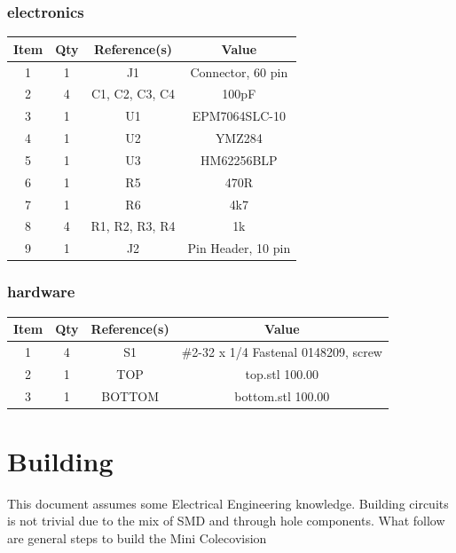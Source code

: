 \subsubsection{electronics}
\begin{footnotesize}
\begin{longtable}{ |*{4}{c|} }
\hline
{Item} & {Qty} & {Reference(s)} & {Value} \\
\hline
{1} & {1} & {J1} & {Connector, 60 pin} \\
\hline
{2} & {4} & {C1, C2, C3, C4} & {100pF} \\
\hline
{3} & {1} & {U1} & {EPM7064SLC-10} \\
\hline
{4} & {1} & {U2} & {YMZ284} \\
\hline
{5} & {1} & {U3} & {HM62256BLP} \\
\hline
{6} & {1} & {R5} & {470R} \\
\hline
{7} & {1} & {R6} & {4k7} \\
\hline
{8} & {4} & {R1, R2, R3, R4} & {1k} \\
\hline
{9} & {1} & {J2} & {Pin Header, 10 pin} \\
\hline
\end{longtable}
\end{footnotesize}

\subsubsection{hardware}
\begin{footnotesize}
\begin{longtable}{ |*{4}{c|} }
\hline
{Item} & {Qty} & {Reference(s)} & {Value} \\
\hline
{1} & {4} & {S1} & {\#2-32 x 1/4 Fastenal 0148209, screw} \\
\hline
{2} & {1} & {TOP} & {top.stl 100.00} \\
\hline
{3} & {1} & {BOTTOM} & {bottom.stl 100.00} \\
\hline
\end{longtable}
\end{footnotesize}

\section{Building}

\par
This document assumes some Electrical Engineering knowledge. Building circuits is not
trivial due to the mix of SMD and through hole components. What follow are general
steps to build the Mini Colecovision

